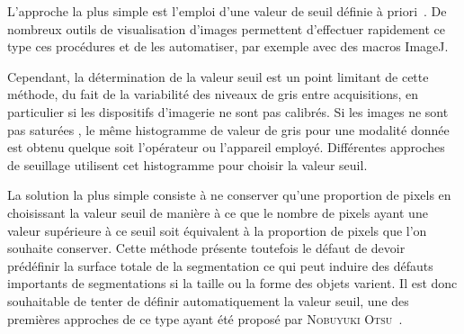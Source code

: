 \documentclass[\main/main.tex]{subfiles}
\begin{document}
L'approche la plus simple est l'emploi d'une valeur de seuil définie à priori~\cite{hinfray_2018}.
%
De nombreux outils de visualisation d'images permettent d'effectuer rapidement ce type ces procédures et de les automatiser, par exemple avec des macros ImageJ.

%
Cependant, la détermination de la valeur seuil est un point limitant de cette méthode, du fait de la variabilité des niveaux de gris entre acquisitions, en particulier si les dispositifs d'imagerie ne sont pas calibrés.
%
Si les images ne sont pas saturées , le même histogramme de valeur de gris pour une modalité donnée est obtenu quelque soit l'opérateur ou l'appareil employé.
%
Différentes approches de seuillage utilisent cet histogramme pour choisir la valeur seuil.

%
La solution la plus simple consiste à ne conserver qu'une proportion de pixels en choisissant la valeur seuil de manière à ce que le nombre de pixels ayant une valeur supérieure à ce seuil soit équivalent à la proportion de pixels que l'on souhaite conserver.
%
Cette méthode présente toutefois le défaut de devoir prédéfinir la surface totale de la segmentation ce qui peut induire des défauts importants de segmentations si la taille ou la forme des objets varient.
%
Il est donc souhaitable de tenter de définir automatiquement la valeur seuil, une des premières approches de ce type ayant été proposé par \textsc{Nobuyuki Otsu}~\cite{otsu_1979}.

\end{document}
